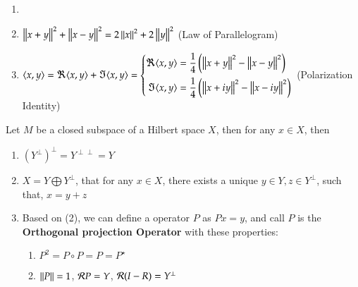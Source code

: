 \begin{theorem}\label{thm:3.7}
\begin{enumerate}[itemsep=0pt, topsep=0pt]
    \item[]
    \item $\Norm{x + y}^{2} + \Norm{x - y}^{2} = 2 \Norm{x}^2 + 2 \Norm{y}^2$ (Law of Parallelogram) 
    \item $\spns{x, y} = \Re{\spns{x, y}} + \Im{\spns{x, y}} = \left\{\begin{aligned}\Re{\spns{x, y}} &= \frac{1}{4}\left(\Norm{x + y}^2 - \Norm{x - y}^2\right) \\ \Im{\spns{x, y}} &= \frac{1}{4}\left(\Norm{x + iy}^2 - \Norm{x - iy}^2\right) \end{aligned}\right.$ (Polarization Identity)
\end{enumerate}
\end{theorem}

\begin{theorem}\label{thm:3.8}
Let $M$ be a closed subspace of a Hilbert space $X$, then for any $x \in X$, then 
\begin{enumerate}[itemsep=0pt, topsep=0pt]
    \item $\left(Y^{\perp}\right)^{\perp} = Y^{\perp \perp} = Y$
    \item $X = Y \bigoplus Y^{\perp}$, that for any $x \in X$, there exists a unique $y \in Y, z \in Y^{\perp}$, such that, $x = y + z$
    \item Based on (2), we can define a operator $P$ as $Px = y$, and call $P$ is the \textbf{Orthogonal projection Operator} with these properties:
    \begin{enumerate}[itemsep=0pt, topsep=0pt]
        \item $P^2 = P \circ P = P = P^{\star}$
        \item $\Norm{P} = 1$, $\mathcal{R}{P} = Y$, $\mathcal{R}(I - R)= Y^{\perp}$
    \end{enumerate}
    
\end{enumerate}
\end{theorem}